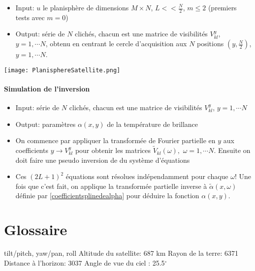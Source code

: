 \documentclass{article}
\begin{document}
\begin{itemize}
    \item Input: $u$ le planisphère de  dimensions $M\times N$, $L<< \frac N2$,  $m\leq 2$ (premiers tests avec $m=0$)
    \item Output:  série de $N$ clichés, chacun est une matrice de visibilités $V_{kl}^y$, $y=1, \cdots N$, obtenu en centrant le cercle d'acquisition aux $N$ positions  $(y, \frac N2)$, $y=1,  \cdots N$.
\end{itemize}


  \texttt{[image: PlanisphereSatellite.png]}
  
       \paragraph{Simulation de l'inversion}
    \begin{itemize}
    \item Input:  série de $N$ clichés, chacun est une matrice de visibilités $V_{kl}^y$, $y=1, \cdots N$
    \item Output: paramètres $\alpha(x,y)$ de la température de brillance
        \item  On commence par appliquer la transformée de Fourier partielle en $y$ aux coefficients $y\to V_{kl}^y$ pour obtenir les matrices $\tilde V_{kl}(\omega),$ $\omega = 1,\cdots N$.
         Ensuite on doit faire une pseudo inversion de du système d'équations  
         
\item  Ces $(2L+1)^2$ équations  sont résolues indépendamment pour chaque $\omega$! Une fois que c'est fait, on  applique la transformée partielle inverse à $\tilde \alpha(x,\omega)$ définie par \eqref{coefficientsplinedealpha} pour déduire la fonction $\alpha(x,y).$

\end{itemize}
  
  
  \section{Glossaire}
  tilt/pitch, yaw/pan,  roll
  Altitude du satellite: 687 km
  Rayon de la terre: 6371
  Distance à l'horizon: 3037
  Angle de vue du ciel : 25.5$^\circ$
  
 
\end{document}
